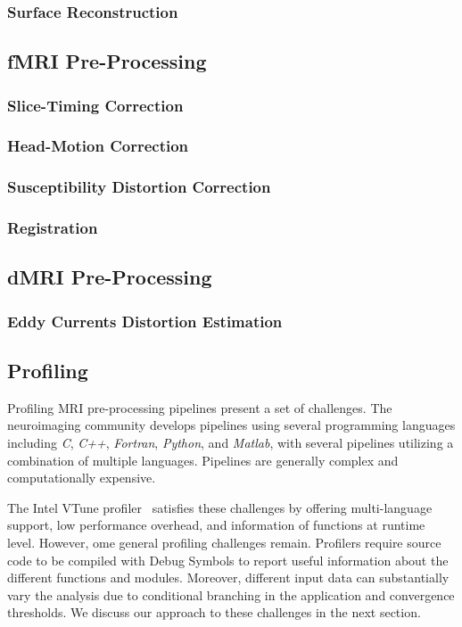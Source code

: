 \documentclass[conference]{IEEEtran}
\begin{document}
\subsubsection{Surface Reconstruction}


\subsection{fMRI Pre-Processing}
\subsubsection{Slice-Timing Correction}


\subsubsection{Head-Motion Correction}


\subsubsection{Susceptibility Distortion Correction}


\subsubsection{Registration}


\subsection{dMRI Pre-Processing}
\subsubsection{Eddy Currents Distortion Estimation}


\subsection{Profiling}
Profiling MRI pre-processing pipelines present a set of challenges. The neuroimaging community develops pipelines using several programming languages including \textit{C}, \textit{C++}, \textit{Fortran}, \textit{Python}, and \textit{Matlab}, with several pipelines utilizing a combination of multiple languages. Pipelines are generally complex and computationally expensive.

The Intel VTune profiler~\cite{vtune_profiler} satisfies these challenges by offering multi-language support, low performance overhead, and information of functions at runtime level. However, ome general profiling challenges remain. Profilers require source code to be compiled with Debug Symbols to report useful information about the different functions and modules. Moreover, different input data can substantially vary the analysis due to conditional branching in the application and convergence thresholds. We discuss our approach to these challenges in the next section.
\end{document}
